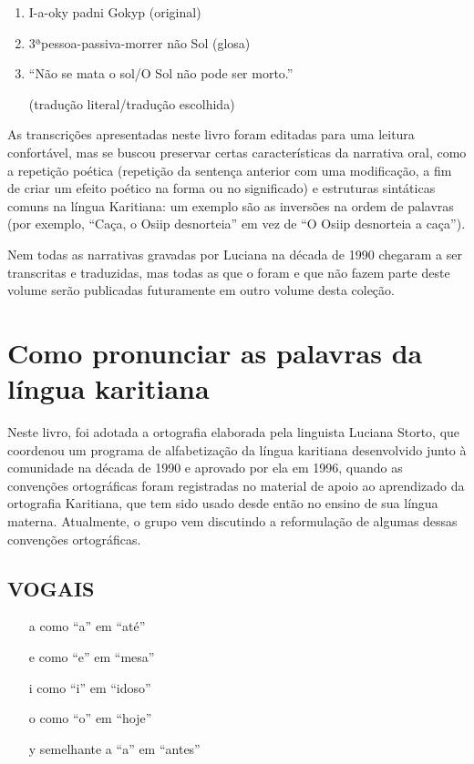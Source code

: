\begin{enumerate}
\item I-a-oky padni Gokyp (original)

\item 3ªpessoa-passiva-morrer não Sol (glosa)

\item ``Não se mata o sol/O Sol não pode ser morto.''

(tradução literal/tradução escolhida)
\end{enumerate}

As transcrições apresentadas neste livro foram editadas para uma leitura
confortável, mas se buscou preservar certas características da narrativa
oral, como a repetição poética (repetição da sentença anterior com uma
modificação, a fim de criar um efeito poético na forma ou no
significado) e estruturas sintáticas comuns na língua Karitiana: um
exemplo são as inversões na ordem de palavras (por exemplo, ``Caça, o
Osiip desnorteia'' em vez de ``O Osiip desnorteia a caça'').

Nem todas as narrativas gravadas por Luciana na década de 1990 chegaram
a ser transcritas e traduzidas, mas todas as que o foram e que não fazem
parte deste volume serão publicadas futuramente em outro volume desta
coleção.

\chapter{Como pronunciar as palavras da língua karitiana}

Neste livro, foi adotada a ortografia elaborada pela linguista Luciana
Storto, que coordenou um programa de alfabetização da língua karitiana
desenvolvido junto à comunidade na década de 1990 e aprovado por ela em
1996, quando as convenções ortográficas foram registradas no material de
apoio ao aprendizado da ortografia Karitiana, que tem sido usado desde
então no ensino de sua língua materna. Atualmente, o grupo vem
discutindo a reformulação de algumas dessas convenções ortográficas.

\section{VOGAIS}

\begin{itemize}
\item[a] como ``a'' em ``até''

\item[e] como ``e'' em ``mesa''

\item[i] como ``i'' em ``idoso''

\item[o] como ``o'' em ``hoje''

\item[y] semelhante a ``a'' em ``antes''
\end{itemize}

